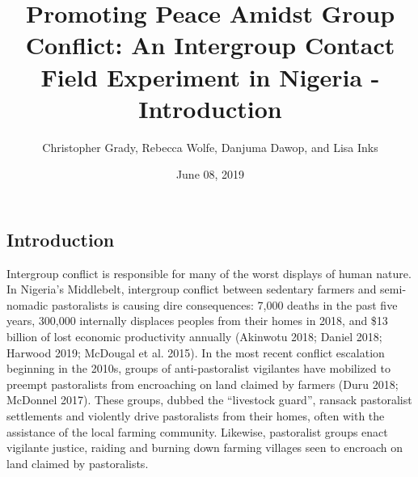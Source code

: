 \documentclass[11pt]{article}
\title{Promoting Peace Amidst Group Conflict: An Intergroup Contact Field
Experiment in Nigeria - Introduction}
\author{
Christopher Grady, Rebecca Wolfe, Danjuma Dawop, and Lisa Inks
}
\date{June 08, 2019}
\begin{document}
\VerbatimFootnotes

%
%
%
%
%
%
%
%
%
%

\maketitle

\hypertarget{introduction}{%
\subsection{Introduction}\label{introduction}}

Intergroup conflict is responsible for many of the worst displays of
human nature. In Nigeria's Middlebelt, intergroup conflict between
sedentary farmers and semi-nomadic pastoralists is causing dire
consequences: 7,000 deaths in the past five years, 300,000 internally
displaces peoples from their homes in 2018, and \$13 billion of lost
economic productivity annually (Akinwotu 2018; Daniel 2018; Harwood
2019; McDougal et al. 2015). In the most recent conflict escalation
beginning in the 2010s, groups of anti-pastoralist vigilantes have
mobilized to preempt pastoralists from encroaching on land claimed by
farmers (Duru 2018; McDonnel 2017). These groups, dubbed the ``livestock
guard'', ransack pastoralist settlements and violently drive
pastoralists from their homes, often with the assistance of the local
farming community. Likewise, pastoralist groups enact vigilante justice,
raiding and burning down farming villages seen to encroach on land
claimed by pastoralists.
\end{document}
